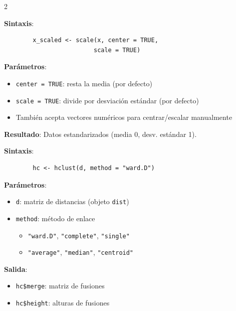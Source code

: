 \documentclass[10pt,a4paper]{article}
\begin{document}
\begin{multicols}{2}
    \begin{tcolorbox}[title=scale(): Estandarización, equal height group=CL6]
        \textbf{Sintaxis}:
        \begin{verbatim}
        x_scaled <- scale(x, center = TRUE, 
                         scale = TRUE)
        \end{verbatim}
        
        \textbf{Parámetros}:
        \begin{itemize}
            \item \texttt{center = TRUE}: resta la media (por defecto)
            \item \texttt{scale = TRUE}: divide por desviación estándar (por defecto)
            \item También acepta vectores numéricos para centrar/escalar manualmente
        \end{itemize}
        
        \textbf{Resultado}: Datos estandarizados (media 0, desv. estándar 1).
    \end{tcolorbox}
    \begin{tcolorbox}[title=hclust(): Clustering Jerárquico, equal height group=CL6]
        \textbf{Sintaxis}:
        \begin{verbatim}
        hc <- hclust(d, method = "ward.D")
        \end{verbatim}
        
        \textbf{Parámetros}:
        \begin{itemize}
            \item \texttt{d}: matriz de distancias (objeto \texttt{dist})
            \item \texttt{method}: método de enlace
            \begin{itemize}
                \item \texttt{"ward.D"}, \texttt{"complete"}, \texttt{"single"}
                \item \texttt{"average"}, \texttt{"median"}, \texttt{"centroid"}
            \end{itemize}
        \end{itemize}
        
        \textbf{Salida}:
        \begin{itemize}
            \item \texttt{hc\$merge}: matriz de fusiones
            \item \texttt{hc\$height}: alturas de fusiones
        \end{itemize}
    \end{tcolorbox}
\end{multicols}
\end{document}
